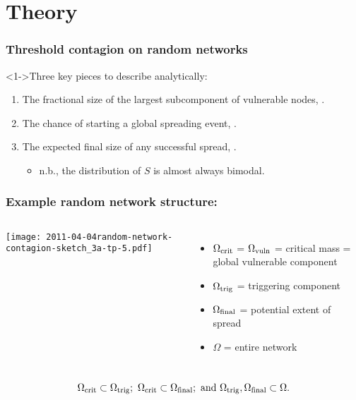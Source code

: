 
\section{Theory}

\begin{frame}
  \frametitle{Threshold contagion on random networks}

  \begin{block}<1->{\alert{Three key pieces} to describe analytically:}
    \begin{enumerate}
    \item<2->
      The fractional size of the largest subcomponent of vulnerable nodes, 
      \alertb{$\Svuln$}.
    \item<3->
      The chance of starting a global spreading event, \alertb{$\Ptrig = \Strig$}.
    \item<4->
      The expected final size of any successful spread, .
      \begin{itemize}
      \item<5-> n.b., the distribution of $S$ is almost always bimodal.
      \end{itemize}

    \end{enumerate}
  \end{block}

\end{frame}

\begin{frame}
  \frametitle{Example random network structure:}

  \begin{columns}
    \texttt{[image: 2011-04-04random-network-contagion-sketch\_3a-tp-5.pdf]}
    \begin{itemize}
    \item 
      $\Omega_{\textnormal{crit}}$ = $\Omega_{\textnormal{vuln}}$ = critical mass = global vulnerable component
    \item 
      $\Omega_{\textnormal{trig}}$ = triggering component
    \item 
      $\Omega_{\textnormal{final}}$ = potential extent of spread
    \item 
      $\Omega$ = entire network
    \end{itemize}
  \end{columns}
  \bigskip
  $$
  \Omega_{\textnormal{crit}} 
  \subset
  \Omega_{\textnormal{trig}};
  \
  \Omega_{\textnormal{crit}} 
  \subset
  \Omega_{\textnormal{final}};
  \
  \mbox{and}
  \
  \Omega_{\textnormal{trig}},
  \Omega_{\textnormal{final}} 
  \subset
  \Omega.
  $$
\end{frame}

